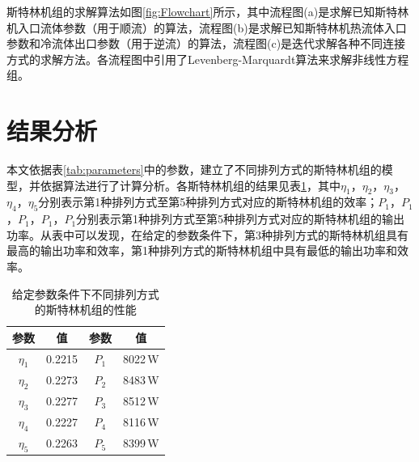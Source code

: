 斯特林机组的求解算法如图\ref{fig:Flowchart}所示，其中流程图(a)是求解已知斯特林机入口流体参数（用于顺流）的算法，流程图(b)是求解已知斯特林机热流体入口参数和冷流体出口参数（用于逆流）的算法，流程图(c)是迭代求解各种不同连接方式的求解方法。各流程图中引用了Levenberg-Marquardt算法来求解非线性方程组。

\section{结果分析}

本文依据表\ref{tab:parameters}中的参数，建立了不同排列方式的斯特林机组的模型，并依据算法进行了计算分析。各斯特林机组的结果见表\ref{tab:result}，其中$\eta_1$，$\eta_2$，$\eta_3$，$\eta_4$，$\eta_5$分别表示第1种排列方式至第5种排列方式对应的斯特林机组的效率；$P_1$，$P_1$，$P_1$，$P_1$，$P_1$分别表示第1种排列方式至第5种排列方式对应的斯特林机组的输出功率。从表中可以发现，在给定的参数条件下，第3种排列方式的斯特林机组具有最高的输出功率和效率，第1种排列方式的斯特林机组中具有最低的输出功率和效率。

\begin{table}[htbp]
\setlength{\abovecaptionskip}{-10pt}
	\caption{给定参数条件下不同排列方式的斯特林机组的性能}
	\begin{center}
	\begin{tabular}{cccc}
		\toprule
		参数		&	值	&	参数		&	值\\
		\midrule
		$\eta_1$	&	0.2215	&	$P_1$		&	8022\,W\\
		$\eta_2$	&	0.2273	&	$P_2$		&	8483\,W\\
		$\eta_3$	&	0.2277	&	$P_3$		&	8512\,W\\
		$\eta_4$	&	0.2227	&	$P_4$		&	8116\,W\\
		$\eta_5$	&	0.2263	&	$P_5$		&	8399\,W\\		
		\bottomrule
	\end{tabular}
	\end{center}
	\label{tab:result}
\end{table}

